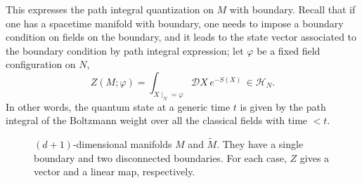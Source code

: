 This expresses the path integral quantization on $M$ with boundary.
Recall that if one has a spacetime manifold with boundary, one needs
to impose a boundary condition on fields on the boundary, and it leads
to the state vector associated to the boundary condition by path integral
expression; let $\varphi$ be a fixed field configuration on
$N$,
\begin{equation}
  Z(M;\varphi)  =  \int_{X\mid_{N}=\varphi}\mathcal{D}X \, e^{-S(X)} \,  \in  \mathcal{H}_{N}.
\end{equation}
 In other words, the quantum state at a generic time $t$ is given
by the path integral of the Boltzmann weight over all the classical
fields with time $<t$.


\begin{figure}
\centering
  \subfloat[\label{}]{  %
    \begin{tikzpicture}[scale=1] %
        \def\bdyradius{0.8cm}

        \draw[thick] (0,-\bdyradius) arc[start angle=-90,end angle=90,x radius=1.8cm,y radius=\bdyradius] node[left=0.3,pos=0.5] {$M$};
        \draw[very thick, red!50] (0,0) node[black] {$N$} circle[x radius=0.4cm,y radius=\bdyradius] node[above=\bdyradius+0.1cm, black] {\normalsize$\mathcal{H}_N$};

    \end{tikzpicture}
  }
\qquad\qquad
  \subfloat[\label{}]{  %
    \begin{tikzpicture}[scale=1] %
        \def\bdyradius{1cm}

        \draw[thick] (0,-\bdyradius) to[out=0,in=180] (1.4cm,0.3cm-\bdyradius) to[out=0,in=180] (4cm,0.2cm-\bdyradius*1.2);
        \draw[thick] (0,\bdyradius) to[out=0,in=180] (2.2cm,-0.2cm+\bdyradius) to[out=0,in=180] (4cm,0.2cm+\bdyradius*1.2);

        \draw[very thick, red!50] (0,0) node[black] {$-N_1$} circle[x radius=0.4cm,y radius=\bdyradius];
        \draw[very thick, red!50] (4,0.2) node[black] {$N_2$} circle[x radius=0.4cm,y radius=\bdyradius*1.2];

        \node at (2,0) {\small$\tilde M$};

    \end{tikzpicture}
  }
  \caption{$(d+1)$-dimensional manifolds $M$ and $\tilde{M}$.
  They have a single boundary and two disconnected boundaries.
  For each case, $Z$ gives a vector and a linear map, respectively.}
  \label{fig:mfd_w_bdys}
\end{figure}


